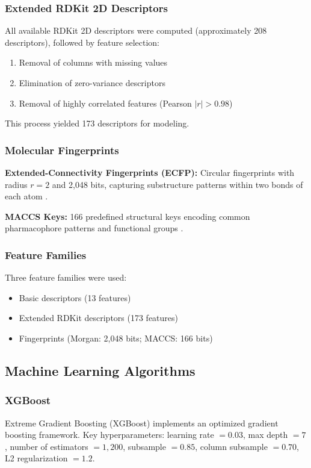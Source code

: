 \documentclass[12pt,a4paper]{article}
\begin{document}
\subsubsection{Extended RDKit 2D Descriptors}
All available RDKit 2D descriptors were computed (approximately 208 descriptors), followed by feature selection:
\begin{enumerate}
    \item Removal of columns with missing values
    \item Elimination of zero-variance descriptors
    \item Removal of highly correlated features (Pearson $|r| > 0.98$)
\end{enumerate}
This process yielded 173 descriptors for modeling.

\subsubsection{Molecular Fingerprints}
\textbf{Extended-Connectivity Fingerprints (ECFP):} Circular fingerprints with radius $r=2$ and 2,048 bits, capturing substructure patterns within two bonds of each atom \citep{rogers2010extendedconnectivity}.

\textbf{MACCS Keys:} 166 predefined structural keys encoding common pharmacophore patterns and functional groups \citep{durant2002reoptimization}.

\subsubsection{Feature Families}
Three feature families were used:
\begin{itemize}
    \item Basic descriptors (13 features)
    \item Extended RDKit descriptors (173 features)
    \item Fingerprints (Morgan: 2,048 bits; MACCS: 166 bits)
\end{itemize}

\subsection{Machine Learning Algorithms}

\subsubsection{XGBoost}
Extreme Gradient Boosting (XGBoost) \citep{chen2015xgboost} implements an optimized gradient boosting framework. Key hyperparameters: learning rate $= 0.03$, max depth $= 7$, number of estimators $= 1,200$, subsample $= 0.85$, column subsample $= 0.70$, L2 regularization $= 1.2$.
\end{document}
